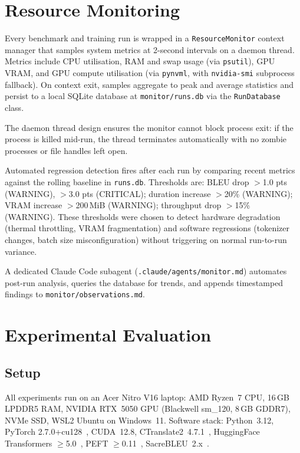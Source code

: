 \documentclass[sigconf]{acmart}
\begin{document}
\section{Resource Monitoring}

Every benchmark and training run is wrapped in a \texttt{ResourceMonitor} context
manager that samples system metrics at 2-second intervals on a daemon thread.
Metrics include CPU utilisation, RAM and swap usage (via \texttt{psutil}), GPU
VRAM, and GPU compute utilisation (via \texttt{pynvml}, with \texttt{nvidia-smi}
subprocess fallback).
On context exit, samples aggregate to peak and average statistics and persist to
a local SQLite database at \texttt{monitor/runs.db} via the \texttt{RunDatabase}
class.

The daemon thread design ensures the monitor cannot block process exit: if the
process is killed mid-run, the thread terminates automatically with no zombie
processes or file handles left open.

Automated regression detection fires after each run by comparing recent metrics
against the rolling baseline in \texttt{runs.db}.
Thresholds are: BLEU drop $>$1.0 pts (WARNING), $>$3.0 pts (CRITICAL); duration
increase $>$20\% (WARNING); VRAM increase $>$200\,MiB (WARNING); throughput
drop $>$15\% (WARNING).
These thresholds were chosen to detect hardware degradation (thermal throttling,
VRAM fragmentation) and software regressions (tokenizer changes, batch size
misconfiguration) without triggering on normal run-to-run variance.

A dedicated Claude Code subagent (\texttt{.claude/agents/monitor.md}) automates
post-run analysis, queries the database for trends, and appends timestamped
findings to \texttt{monitor/observations.md}.

\section{Experimental Evaluation}

\subsection{Setup}

All experiments run on an Acer Nitro V16 laptop: AMD Ryzen~7 CPU, 16\,GB LPDDR5
RAM, NVIDIA RTX~5050 GPU (Blackwell sm\_120, 8\,GB GDDR7), NVMe SSD, WSL2 Ubuntu
on Windows~11.
Software stack: Python~3.12, PyTorch 2.7.0+cu128~\cite{pytorch2024}, CUDA~12.8,
CTranslate2~4.7.1~\cite{ctranslate2_klein}, HuggingFace Transformers $\geq$5.0~\cite{wolf2020transformers},
PEFT $\geq$0.11~\cite{peft2022}, SacreBLEU~2.x~\cite{post2018call}.
\end{document}

